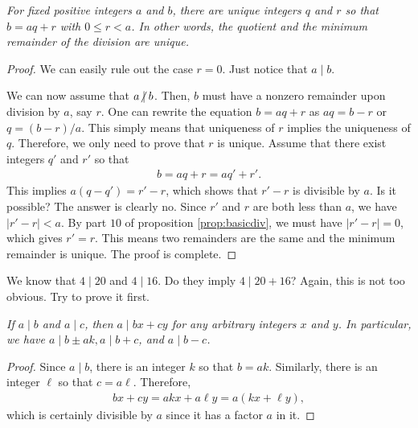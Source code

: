 \documentclass{subfile}
\begin{document}
	\begin{proposition}\slshape
		For fixed positive integers $a$ and $b$, there are unique integers $q$ and $r$ so that $b=aq+r$ with $0\leq r<a$. In other words, the quotient and the minimum remainder of the division are unique.
	\end{proposition}

	\begin{proof}
		We can easily rule out the case $r=0$. Just notice that $a\mid b$.

		We can now assume that $a\centernot\mid b$. Then, $b$ must have a nonzero remainder upon division by $a$, say $r$. One can rewrite the equation $b=aq+r$ as $aq=b-r$ or $q=(b-r)/a$. This simply means that uniqueness of $r$ implies the uniqueness of $q$. Therefore, we only need to prove that $r$ is unique. Assume that there exist integers $q'$ and $r'$ so that
		\begin{align*}
			b=aq+r=aq'+r'.
		\end{align*}
		This implies $a(q-q')=r'-r$, which shows that $r'-r$ is divisible by $a$. Is it possible? The answer is clearly no. Since $r'$ and $r$ are both less than $a$, we have $|r'-r|<a$. By part $10$ of proposition \eqref{prop:basicdiv}, we must have $|r'-r|=0$, which gives $r'=r$. This means two remainders are the same and the minimum remainder is unique. The proof is complete.
	\end{proof}


	\begin{question}
		We know that $4\mid 20$ and $4\mid 16$. Do they imply $4\mid 20+16$? Again, this is not too obvious. Try to prove it first.
	\end{question}

	\begin{proposition}\slshape\label{prop:a|bx+cy}
		If $a\mid b$ and $a\mid c$, then $a\mid bx+cy$ for any arbitrary integers $x$ and $y$. In particular, we have $a\mid b\pm ak,a\mid b+c$, and $a\mid b-c$.
	\end{proposition}

	\begin{proof}
		Since $a\mid b$, there is an integer $k$ so that $b=ak$. Similarly, there is an integer $\ell$ so that $c=a\ell$. Therefore,
		\begin{align*}
			bx+cy=akx+a\ell y=a(kx+\ell y),
		\end{align*}
		which is certainly divisible by $a$ since it has a factor $a$ in it.
	\end{proof}
\end{document}
